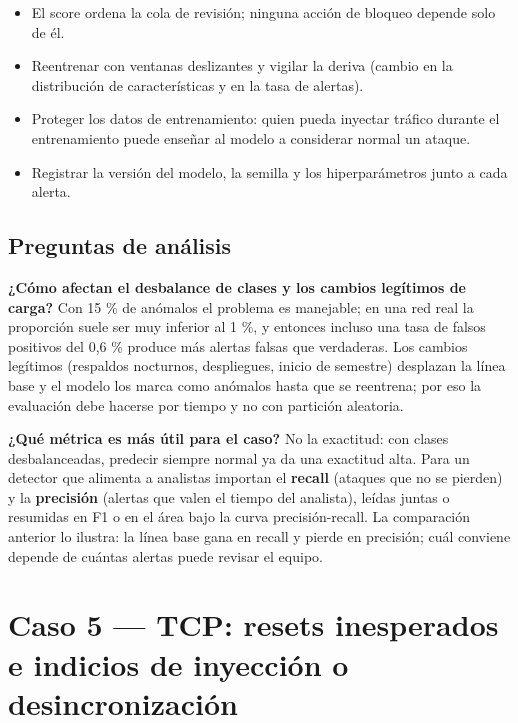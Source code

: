 \begin{itemize}
  \item El score ordena la cola de revisión; ninguna acción de bloqueo depende solo de él.
  \item Reentrenar con ventanas deslizantes y vigilar la deriva (cambio en la distribución de características y en la tasa de alertas).
  \item Proteger los datos de entrenamiento: quien pueda inyectar tráfico durante el entrenamiento puede enseñar al modelo a considerar normal un ataque.
  \item Registrar la versión del modelo, la semilla y los hiperparámetros junto a cada alerta.
\end{itemize}

\subsection{Preguntas de análisis}

\textbf{¿Cómo afectan el desbalance de clases y los cambios legítimos de carga?} Con 15 \% de anómalos el problema es manejable; en una red real la proporción suele ser muy inferior al 1 \%, y entonces incluso una tasa de falsos positivos del 0,6 \% produce más alertas falsas que verdaderas. Los cambios legítimos (respaldos nocturnos, despliegues, inicio de semestre) desplazan la línea base y el modelo los marca como anómalos hasta que se reentrena; por eso la evaluación debe hacerse por tiempo y no con partición aleatoria.

\textbf{¿Qué métrica es más útil para el caso?} No la exactitud: con clases desbalanceadas, predecir siempre \guillemotleft{}normal\guillemotright{} ya da una exactitud alta. Para un detector que alimenta a analistas importan el \textbf{recall} (ataques que no se pierden) y la \textbf{precisión} (alertas que valen el tiempo del analista), leídas juntas o resumidas en F1 o en el área bajo la curva precisión-recall. La comparación anterior lo ilustra: la línea base gana en recall y pierde en precisión; cuál conviene depende de cuántas alertas puede revisar el equipo.

\section{Caso 5 --- TCP: resets inesperados e indicios de inyección o desincronización}

 

